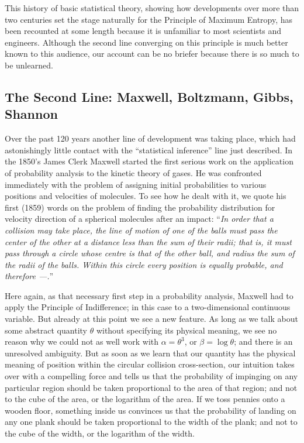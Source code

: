 This history of basic statistical theory, showing how developments over more than two centuries set the stage naturally for the Principle of Maximum Entropy, has been recounted at some length because it is unfamiliar to most scientists and engineers.
Although the second line converging on this principle is much better known to this audience, our account can be no briefer because there is so much to be unlearned.


\subsection[The Second Line: Maxwell to Shannon]{The Second Line: Maxwell, Boltzmann, Gibbs, Shannon}
Over the past 120 years another line of development was taking place, which had astonishingly little contact with the ``statistical inference'' line just described.
In the 1850's James Clerk Maxwell started the first serious work on the application of probability analysis to the kinetic theory of gases.
He was confronted immediately with the problem of assigning initial probabilities to various positions and velocities of molecules.
To see how he dealt with it, we quote his first (1859) words on the problem of finding the probability distribution for velocity direction of a spherical molecules after an impact: ``\emph{In order that a collision may take place, the line of motion of one of the balls must pass the center of the other at a distance less than the sum of their radii; that is, it must pass through a circle whose centre is that of the other ball, and radius the sum of the radii of the balls. Within this circle every position is equally probable, and therefore ---.}''

Here again, as that necessary first step in a probability analysis, Maxwell had to apply the Principle of Indifference; in this case to a two-dimensional continuous variable.
But already at this point we see a new feature.
As long as we talk about some abstract quantity $\theta$ without specifying its physical meaning, we see no reason why we could not as well work with $\alpha=\theta^3$, or $\beta = \log \theta$; and there is an unresolved ambiguity.
But as soon as we learn that our quantity has the physical meaning of position within the circular collision cross-section, our intuition takes over with a compelling force and tells us that the probability of impinging on any particular region should be taken proportional to the area of that region; and not to the cube of the area, or the logarithm of the area.
If we toss pennies onto a wooden floor, something inside us convinces us that the probability of landing on any one plank should be taken proportional to the width of the plank; and not to the cube of the width, or the logarithm of the width.


